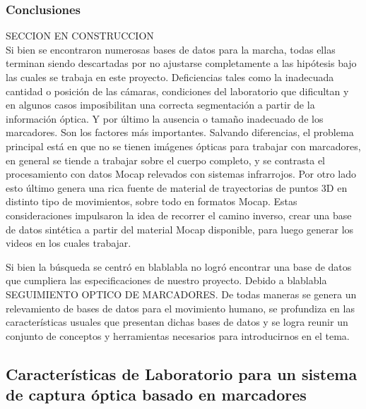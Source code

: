 \subsubsection{Conclusiones}\label{conclusiones_revision_base_datos} SECCION EN CONSTRUCCION\\

Si bien se encontraron numerosas bases de datos para la marcha, todas ellas terminan siendo descartadas por no ajustarse completamente a las hipótesis bajo las cuales se trabaja en este proyecto. Deficiencias tales como la inadecuada cantidad o posición de las cámaras, condiciones del laboratorio que dificultan y en algunos casos imposibilitan una correcta segmentación a partir de la información óptica. Y por último la ausencia o tamaño inadecuado de los marcadores. Son los factores más importantes.
Salvando diferencias, el problema principal está en que no se tienen imágenes ópticas para trabajar con marcadores, en general se tiende a trabajar sobre el cuerpo completo, y se contrasta el procesamiento con datos Mocap relevados con sistemas infrarrojos. Por otro lado esto último genera una rica fuente de material de trayectorias de puntos 3D en distinto tipo de movimientos, sobre todo en formatos Mocap.
Estas consideraciones impulsaron la idea de recorrer el camino inverso, crear una base de datos sintética a partir del material Mocap disponible, para luego generar los videos en los cuales trabajar.  







Si bien la búsqueda se centró en blablabla no logró encontrar una base de datos que cumpliera las especificaciones de nuestro proyecto. Debido a blablabla SEGUIMIENTO OPTICO DE MARCADORES.
 De todas maneras se genera un relevamiento de bases de datos para el movimiento humano, se profundiza en las características usuales que presentan dichas bases de datos y se logra reunir un conjunto de conceptos y herramientas necesarios para introducirnos en el tema. 



\subsection{Características de Laboratorio para un sistema de captura óptica basado en marcadores}
\label{seccion_Caracteristicas_Laboratorio}
 
